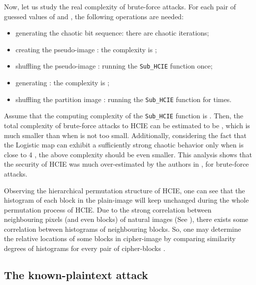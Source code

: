 \documentclass[final,3p,times,twocolumn]{elsarticle}
\begin{document}
Now, let
us study the real complexity of brute-force attacks. For each pair
of guessed values of  and , the following operations
are needed:
\begin{itemize}
\item generating the chaotic bit sequence: there are  chaotic
iterations;

\item creating the pseudo-image : the complexity is ;

\item shuffling the pseudo-image : running the
\texttt{Sub\_HCIE} function once;

\item generating : the complexity is ;

\item shuffling the partition image : running the
\texttt{Sub\_HCIE} function for
 times.
\end{itemize}
Assume that the computing complexity of the \texttt{Sub\_HCIE}
function is . Then, the total complexity of
brute-force attacks to HCIE can be estimated to be
, which is much smaller than
 when  is not too small.
Additionally, considering the fact that the Logistic map can
exhibit a sufficiently strong chaotic behavior only when  is
close to 4 \cite{Li:logistic:ND2014}, the above complexity should
be even smaller. This analysis shows that the security of
HCIE was much over-estimated by the authors in
\cite{Yen-Guo:HCIE:ISC99,Yen-Guo:HCIE:IEEPVISP2000}, for brute-force attacks.

Observing the hierarchical permutation structure of HCIE, one can see that
the histogram of each  block in the plain-image will keep unchanged
during the whole permutation process of HCIE. Due to the strong correlation between neighbouring pixels
(and even blocks) of natural images (See \cite[Fig.~5]{Li:RCES:JSS2008}), there exists some correlation between histograms of neighbouring blocks.
So, one may determine the relative locations of some blocks in cipher-image by comparing similarity degrees of
histograms for every pair of cipher-blocks \cite{HSLI:Banknote:TM14,Ling:histogramcomparison:PAMI07}.

\subsection{The known-plaintext attack}
\end{document}
